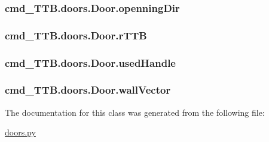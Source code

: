 \subsubsection[{\texorpdfstring{openning\+Dir}{openningDir}}]{\setlength{\rightskip}{0pt plus 5cm}cmd\+\_\+\+T\+T\+B.\+doors.\+Door.\+openning\+Dir}\hypertarget{classcmd__TTB_1_1doors_1_1Door_a8c669d6f1e191e3807a4eeffedbfb094}{}\label{classcmd__TTB_1_1doors_1_1Door_a8c669d6f1e191e3807a4eeffedbfb094}
\subsubsection[{\texorpdfstring{r\+T\+TB}{rTTB}}]{\setlength{\rightskip}{0pt plus 5cm}cmd\+\_\+\+T\+T\+B.\+doors.\+Door.\+r\+T\+TB}\hypertarget{classcmd__TTB_1_1doors_1_1Door_a4ee8a303c778727a2b64a9bee7fa5b0a}{}\label{classcmd__TTB_1_1doors_1_1Door_a4ee8a303c778727a2b64a9bee7fa5b0a}
\subsubsection[{\texorpdfstring{used\+Handle}{usedHandle}}]{\setlength{\rightskip}{0pt plus 5cm}cmd\+\_\+\+T\+T\+B.\+doors.\+Door.\+used\+Handle}\hypertarget{classcmd__TTB_1_1doors_1_1Door_a8c7e61d5731244caf6322dd2ca9101b9}{}\label{classcmd__TTB_1_1doors_1_1Door_a8c7e61d5731244caf6322dd2ca9101b9}
\subsubsection[{\texorpdfstring{wall\+Vector}{wallVector}}]{\setlength{\rightskip}{0pt plus 5cm}cmd\+\_\+\+T\+T\+B.\+doors.\+Door.\+wall\+Vector}\hypertarget{classcmd__TTB_1_1doors_1_1Door_a4004e9f386328abd8dd549878d2bd9f8}{}\label{classcmd__TTB_1_1doors_1_1Door_a4004e9f386328abd8dd549878d2bd9f8}


The documentation for this class was generated from the following file\+:\begin{DoxyCompactItemize}
\item 
\hyperlink{doors_8py}{doors.\+py}\end{DoxyCompactItemize}
